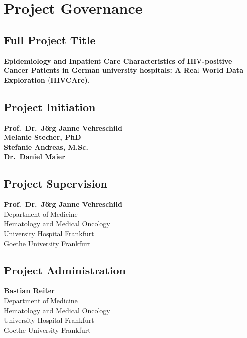 \documentclass[
  letterpaper,
  DIV=11,
  numbers=noendperiod]{scrreprt}
\begin{document}
\hypertarget{project-governance}{%
\chapter{Project Governance}\label{project-governance}}

\hfill\break

\hypertarget{full-project-title}{%
\section{Full Project Title}\label{full-project-title}}

\textbf{Epidemiology and Inpatient Care Characteristics of HIV-positive
Cancer Patients in German university hospitals: A Real World Data
Exploration (HIVCAre).}

\hypertarget{project-initiation}{%
\section{Project Initiation}\label{project-initiation}}

\textbf{Prof.~Dr.~Jörg Janne Vehreschild\\
Melanie Stecher, PhD\\
Stefanie Andreas, M.Sc.\\
Dr.~Daniel Maier}

\hypertarget{project-supervision}{%
\section{Project Supervision}\label{project-supervision}}

\textbf{Prof.~Dr.~Jörg Janne Vehreschild}\\
{Department of Medicine\\
Hematology and Medical Oncology\\
University Hospital Frankfurt\\
Goethe University Frankfurt}

\hypertarget{project-administration}{%
\section{Project Administration}\label{project-administration}}

\textbf{Bastian Reiter}\\
{Department of Medicine\\
Hematology and Medical Oncology\\
University Hospital Frankfurt\\
Goethe University Frankfurt}
\end{document}
